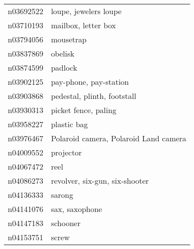 \begin{appendices}
{\begin{footnotesize}
\begin{longtabu}{X|X[4]}
    		n03692522 &                                                                                                      loupe, jewelers loupe \tabularnewline
    		n03710193 &                                                                                                        mailbox, letter box \tabularnewline
    		n03794056 &                                                                                                                  mousetrap \tabularnewline
    		n03837869 &                                                                                                                    obelisk \tabularnewline
    		n03874599 &                                                                                                                    padlock \tabularnewline
    		n03902125 &                                                                                                     pay-phone, pay-station \tabularnewline
    		n03903868 &                                                                                                pedestal, plinth, footstall \tabularnewline
    		n03930313 &                                                                                                       picket fence, paling \tabularnewline
    		n03958227 &                                                                                                                plastic bag \tabularnewline
    		n03976467 &                                                                                      Polaroid camera, Polaroid Land camera \tabularnewline
    		n04009552 &                                                                                                                  projector \tabularnewline
    		n04067472 &                                                                                                                       reel \tabularnewline
    		n04086273 &                                                                                             revolver, six-gun, six-shooter \tabularnewline
    		n04136333 &                                                                                                                     sarong \tabularnewline
    		n04141076 &                                                                                                             sax, saxophone \tabularnewline
    		n04147183 &                                                                                                                   schooner \tabularnewline
    		n04153751 &                                                                                                                      screw \tabularnewline

\end{longtabu}
\end{footnotesize}}
\end{appendices}
